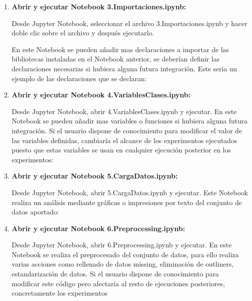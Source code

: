 \begin{enumerate}
\begin{enumerate}
    
    
   \item
    \textbf{Abrir y ejecutar Notebook 3.Importaciones.ipynb:} 
    
    Desde Jupyter Notebook, seleccionar el archivo 3.Importaciones.ipynb y hacer doble clic sobre el archivo y después ejecutarlo.
    
    En este Notebook se pueden añadir mas declaraciones a importar de las bibliotecas instaladas en el Notebook anterior, se deberían definir las declaraciones necesarias si hubiera alguna futura integración. Este seria un ejemplo de las declaraciones que se declaran:
    
    
   \item
    \textbf{Abrir y ejecutar Notebook 4.VariablesClases.ipynb:} 
    
    Desde Jupyter Notebook, abrir 4.VariablesClases.ipynb y ejecutar. En este Notebook se pueden añadir mas variables o funciones si hubiera alguna futura integración.
    Si el usuario dispone de conocimiento para modificar el valor de las variables definidas, cambiaría el alcance de los experimentos ejecutados puesto que estas variables se usan en cualquier ejecución posterior en los experimentos:
    
    
    \item
    \textbf{Abrir y ejecutar Notebook 5.CargaDatos.ipynb:} 
    
    Desde Jupyter Notebook, abrir 5.CargaDatos.ipynb y ejecutar. Este Notebook realiza un análisis mediante gráficas o impresiones por texto del conjunto de  datos aportado:
    
    
     \item
    \textbf{Abrir y ejecutar Notebook 6.Preprocessing.ipynb:} 
    
    Desde Jupyter Notebook, abrir 6.Preprocessing.ipynb y ejecutar. En este Notebook se realiza el preprocesado del conjunto de datos, para ello realiza varias acciones como rellenado de datos missing, eliminación de outliners, estandarización de datos.
    Si el usuario dispone de conocimiento para modificar este código pero afectaría al resto de ejecuciones posteriores, concretamente los experimentos
    

\end{enumerate}
\end{enumerate}
